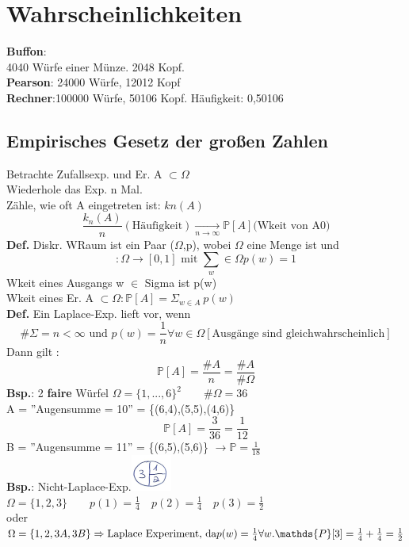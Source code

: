 \section{Wahrscheinlichkeiten}
\textbf{Buffon}:\\
4040 Würfe einer Münze. 2048 Kopf.\medskip\\
\textbf{Pearson}: 24000 Würfe, 12012 Kopf\medskip\\
\textbf{Rechner}:100000 Würfe, 50106 Kopf. Häufigkeit: 0,50106\\
\subsection{Empirisches Gesetz der großen Zahlen}
Betrachte Zufallsexp. und Er. A $\subset \Omega$\\
Wiederhole das Exp. n Mal.\\
Zähle, wie oft A eingetreten ist: $kn(A)$ $$\frac{k_n(A)}{n} (\text{Häufigkeit}) \underset{n\rightarrow \infty}{\rightarrow} \mathds {P}[A] \text{(Wkeit von A0)}$$ 
\textbf{Def.} Diskr. WRaum ist ein Paar ($\Omega$,p), wobei $\Omega$ eine Menge ist und
$$:\Omega \rightarrow [0,1] \text{ mit } \sum_w\in \Omega p(w) = 1$$
Wkeit eines Ausgangs w $\in$ Sigma ist p(w)\\
Wkeit eines Er. A $\subset \Omega : \mathds {P}[A]=\Sigma_{w\in A}\:p(w)$\medskip\\
\textbf{Def.} Ein Laplace-Exp. lieft vor, wenn 
$$\#\Sigma = n < \infty \text{ und } p(w) = \frac{1}{n}\forall w \in \Omega[\text{Ausgänge sind gleichwahrscheinlich}]$$
Dann gilt : $$\mathds {P}[A]=\frac{\#A}{n}= \frac{\#A}{\#\Omega}$$
\textbf{Bsp.}: 2 \textbf{faire} Würfel $\Omega = \{1,...,6\}^2 \qquad \#\Omega = 36$\\
A = ''Augensumme  = 10'' = \{(6,4),(5,5),(4,6)\}
$$\mathds {P}[A] = \frac{3}{36}=\frac{1}{12}$$
B = ''Augensumme = 11'' = \{(6,5),(5,6)\} $\rightarrow \mathds {P}=\frac{1}{18}$\medskip\\
\textbf{Bsp.}: Nicht-Laplace-Exp.\includegraphics[width=0.1\textwidth]{img/torte.PNG}\\
$\Omega = \{1,2,3\} \qquad p(1) = \frac{1}{4} \quad p(2)=\frac{1}{4} \quad p(3) = \frac{1}{2}$\\oder
$\Omega = \{1,2,3A,3B\} \Rightarrow \text{Laplace Experiment, da} \\ p(w) = \frac{1}{4} \forall w. \mathds {P}[3] = \frac{1}{4}+\frac{1}{4} = \frac{1}{2}$\medskip\\

